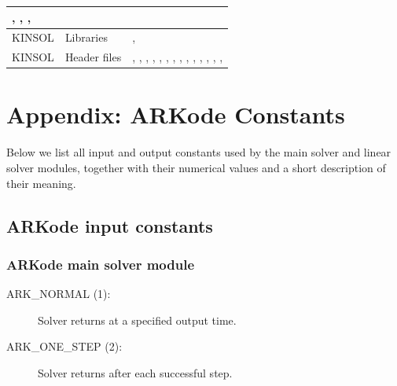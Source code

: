 \documentclass[letterpaper,10pt,english]{sphinxmanual}
\begin{document}
\begin{tabulary}{\linewidth}{|L|L|L|}
,
,
,
\\
\hline
KINSOL
 & 
Libraries
 & 
,
\\
\hline
KINSOL
 & 
Header files
 & 
,
,
,
,
,
,
,
,
,
,
,
,
,
,
\\
\hline\end{tabulary}



\chapter{Appendix: ARKode Constants}
\label{Constants:appendix-arkode-constants}\label{Constants::doc}\label{Constants:constants}
Below we list all input and output constants used by the main solver
and linear solver modules, together with their numerical values and a
short description of their meaning.


\section{ARKode input constants}
\label{Constants:arkode-input-constants}

\subsection{ARKode main solver module}
\label{Constants:arkode-main-solver-module}\begin{description}
\item[{ARK\_NORMAL (1):}] \leavevmode
Solver returns at a specified output time.

\item[{ARK\_ONE\_STEP  (2):}] \leavevmode
Solver returns after each successful step.

\end{description}
\end{document}
